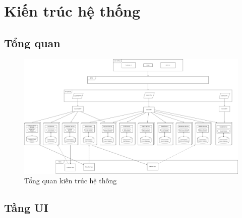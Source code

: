 \section{Kiến trúc hệ thống}
\subsection{Tổng quan}
\begin{figure}[!htp]
	\centering
	\includegraphics[width=6in]{img/Architecture/general-architect.png}
	\newline
	\caption{Tổng quan kiến trúc hệ thống}
\end{figure}

\subsection{Tầng UI}




